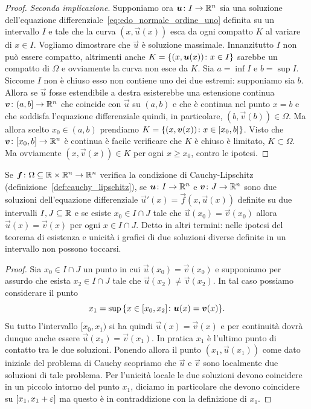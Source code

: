 \begin{proof}
\emph{Seconda implicazione}. Supponiamo ora $\boldsymbol u\colon I\to {\mathbb R}^n$ sia una soluzione dell'equazione 
differenziale~\eqref{eq:edo_normale_ordine_uno} definita su un intervallo $I$ e tale che la curva 
$(x,\vec u(x))$ esca da ogni compatto $K$ al variare di $x\in I$. 
Vogliamo dimostrare che $\vec u$ è soluzione massimale. 
Innanzitutto $I$ non può essere compatto, altrimenti anche $K={\left\{ (x,\boldsymbol u(x))\colon x \in I \right\}}$ 
sarebbe un compatto di $\Omega$ e ovviamente la curva non esce da $K$.
Sia $a=\inf I$ e $b=\sup I$. 
Siccome $I$ non è chiuso esso non contiene uno dei due estremi: supponiamo sia $b$. 
Allora se $\vec u$ fosse estendibile a destra esisterebbe una estensione continua 
$\boldsymbol v\colon (a,b]\to {\mathbb R}^n$ che coincide con $\vec u$ su $(a,b)$ e che è continua 
nel punto $x=b$ e che soddisfa l'equazione differenziale quindi, in particolare, $(b,\vec v(b))\in \Omega$.
Ma allora scelto $x_0 \in (a,b)$
prendiamo $K={\left\{ (x,\boldsymbol v(x))\colon x\in [x_0,b] \right\}}$. 
Visto che $\boldsymbol v\colon[x_0,b]\to {\mathbb R}^n$ è continua è facile verificare che $K$ è chiuso è limitato, 
$K\subset \Omega$. Ma ovviamente $(x,\vec v(x))\in K$ per ogni $x\ge x_0$, contro le ipotesi.
\end{proof}

\begin{proposition}
\label{prop:separazione_soluzioni}%
Se $\boldsymbol f\colon \Omega\subseteq {\mathbb R} \times {\mathbb R}^n\to {\mathbb R}^n$
verifica la condizione di Cauchy-Lipschitz (definizione~\ref{def:cauchy_lipschitz}),
se $\boldsymbol u\colon I \to {\mathbb R}^n$ e $\boldsymbol v\colon J\to{\mathbb R}^n$ sono due soluzioni
dell'equazione differenziale
$\vec u'(x) = \vec f(x,\vec u(x))$
definite su due intervalli $I,J \subseteq {\mathbb R}$  
e se esiste $x_0\in I\cap J$ tale che $\vec u(x_0) = \vec v(x_0)$ allora $\vec u(x) = \vec v(x)$ per ogni $x\in I\cap J$.
Detto in altri termini: nelle ipotesi del teorema di esistenza e unicità i grafici di due soluzioni diverse definite in un intervallo non possono toccarsi.
\end{proposition}
%
\begin{proof}
Sia $x_0 \in I\cap J$ un punto in cui $\vec u(x_0) = \vec v(x_0)$
e supponiamo per assurdo che esista $x_2 \in I\cap J$ tale che $\vec u(x_2)\neq \vec v(x_2)$. In tal caso possiamo considerare il punto
\[
   x_1 = \sup {\left\{ x \in [x_0,x_2] \colon \boldsymbol u(x) = \boldsymbol v(x) \right\}}.
\]
Su tutto l'intervallo $[x_0,x_1)$ si ha quindi $\vec u(x) = \vec v(x)$ e per continuità dovrà dunque anche essere $\vec u(x_1) =  \vec v(x_1)$.
In pratica $x_1$ è l'ultimo punto di contatto tra le due soluzioni.
Ponendo allora il punto $(x_1,\vec u(x_1))$ come dato iniziale del problema di Cauchy scopriamo che $\vec u$ e $\vec v$ sono localmente due soluzioni di tale problema. Per l'unicità locale le due soluzioni devono coincidere in un piccolo intorno del punto $x_1$, diciamo in particolare che devono coincidere su $[x_1,x_1+\varepsilon]$ ma questo è in contraddizione con la definizione di $x_1$.
\end{proof}

